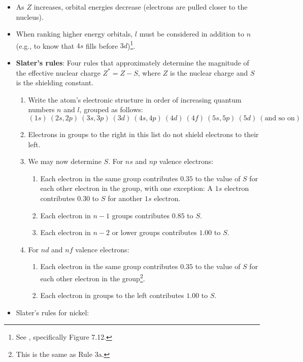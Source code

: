 \documentclass[../main.tex]{subfiles}
\begin{document}
\begin{itemize}
    \item As $Z$ increases, orbital energies decrease (electrons are pulled closer to the nucleus).
    \item When ranking higher energy orbitals, $l$ must be considered in addition to $n$ (e.g., to know that $4s$ fills before $3d$)\footnote{See \textcite{bib:APChemNotes}, specifically Figure 7.12.}.
    \item \textbf{Slater's rules}: Four rules that approximately determine the magnitude of the effective nuclear charge $Z^*=Z-S$, where $Z$ is the nuclear charge and $S$ is the shielding constant.
    \begin{enumerate}
        \item Write the atom's electronic structure in order of increasing quantum numbers $n$ and $l$, grouped as follows:
        \begin{equation*}
            (1s)\ (2s,2p)\ (3s,3p)\ (3d)\ (4s,4p)\ (4d)\ (4f)\ (5s,5p)\ (5d)\ (\text{and so on})
        \end{equation*}
        \item Electrons in groups to the right in this list do not shield electrons to their left.
        \item We may now determine $S$. For $ns$ and $np$ valence electrons:
        \begin{enumerate}[label={\alph*.}]
            \item Each electron in the same group contributes $0.35$ to the value of $S$ for each other electron in the group, with one exception: A $1s$ electron contributes $0.30$ to $S$ for another $1s$ electron.
            \item Each electron in $n-1$ groups contributes $0.85$ to $S$.
            \item Each electron in $n-2$ or lower groups contributes $1.00$ to $S$.
        \end{enumerate}
        \item For $nd$ and $nf$ valence electrons:
        \begin{enumerate}[label={\alph*.}]
            \item Each electron in the same group contributes $0.35$ to the value of $S$ for each other electron in the group\footnote{This is the same as Rule 3a.}.
            \item Each electron in groups to the left contributes $1.00$ to $S$.
        \end{enumerate}
    \end{enumerate}
    \item Slater's rules for nickel:

\end{itemize}
\end{document}
